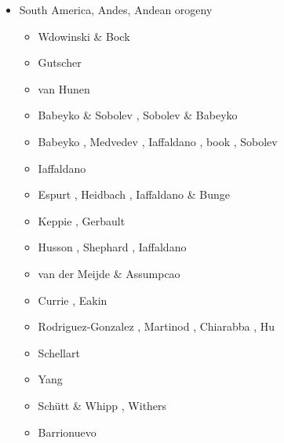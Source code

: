 \begin{itemize}
\item South America, Andes, Andean orogeny 

\begin{scriptsize}
\begin{itemize}
\item[\nineteenninetyfour] Wdowinski \& Bock \cite{wdbo94b}
\item[\twothousand] Gutscher \etal \cite{gusb00}
\item[\twothousandtwo] van Hunen \etal \cite{vavv02b}
\item[\twothousandfive] Babeyko \& Sobolev \cite{baso05}, Sobolev \& Babeyko \cite{soba05}
\item[\twothousandsix] Babeyko \etal \cite{basv06}, Medvedev \etal \cite{meph06},
                       Iaffaldano \etal \cite{iabd06}, book \cite{oncf06}, Sobolev \etal \cite{sobk06}
\item[\twothousandseven] Iaffaldano \etal \cite{iabb07}
\item[\twothousandeight] Espurt \etal \cite{esfm08}, Heidbach \etal \cite{heib08}, 
                         Iaffaldano \& Bunge \cite{iabu08}
\item[\twothousandnine] Keppie \etal \cite{kecw09}, Gerbault \etal \cite{gecm09}
\item[\twothousandtwelve] Husson \etal \cite{hucf12}, Shephard \etal \cite{shlm12},
                          Iaffaldano \cite{iadc12}
\item[\twothousandthirteen] van der Meijde \& Assumpcao \cite{waja13}
\item[\twothousandfifteen] Currie \etal \cite{cudd15}, Eakin \etal \cite{ealw15}
\item[\twothousandsixteen] Rodriguez-Gonzalez \etal \cite{robn16}, Martinod \etal \cite{marl16}, 
                           Chiarabba \etal \cite{chdf16}, Hu \etal \cite{hulh16}
\item[\twothousandseventeen] Schellart \cite{sche17}
\item[\twothousandnineteen] Yang \etal \cite{yamg19}
\item[\twothousandtwenty] Sch{\"u}tt \& Whipp \cite{scwh20}, Withers \cite{with20}
\item[\twothousandtwentyone] Barrionuevo \etal \cite{balm21}
\end{itemize}
\end{scriptsize}


\end{itemize}

